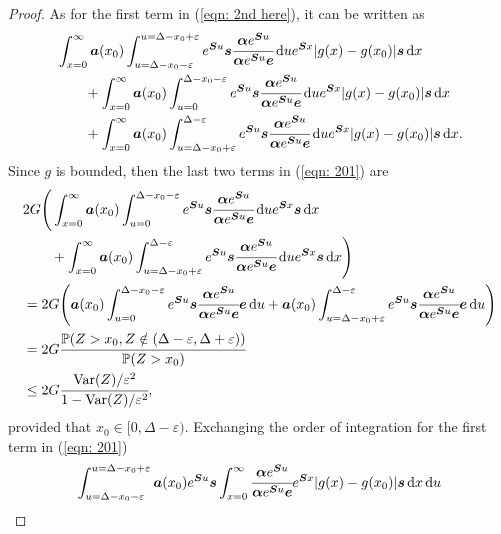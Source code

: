 \begin{proof}
	As for the first term in (\ref{eqn: 2nd here}), it can be written as 
	\begin{align}
		&\int_{x=0}^\infty \boldsymbol a(x_0)\int_{u=\Delta-x_0-\varepsilon}^{u=\Delta-x_0+\varepsilon} e^{\boldsymbol Su}\boldsymbol s \cfrac{\boldsymbol \alpha e^{\boldsymbol Su}}{\boldsymbol \alpha e^{\boldsymbol Su}\boldsymbol e} \, \mathrm{d} u e^{\boldsymbol Sx}|g(x) - g(x_0)|\boldsymbol s\, \mathrm{d} x \nonumber
		\\&\qquad{}+\int_{x=0}^\infty \boldsymbol a(x_0)\int_{u=0}^{\Delta-x_0-\varepsilon} e^{\boldsymbol Su}\boldsymbol s \cfrac{\boldsymbol \alpha e^{\boldsymbol Su}}{\boldsymbol \alpha e^{\boldsymbol Su}\boldsymbol e} \, \mathrm{d} u e^{\boldsymbol Sx}|g(x) - g(x_0)|\boldsymbol s\, \mathrm{d} x \nonumber
		\\&\qquad{}+\int_{x=0}^\infty \boldsymbol a(x_0)\int_{u=\Delta-x_0+\varepsilon}^{\Delta-\varepsilon} e^{\boldsymbol Su}\boldsymbol s \cfrac{\boldsymbol \alpha e^{\boldsymbol Su}}{\boldsymbol \alpha e^{\boldsymbol Su}\boldsymbol e} \, \mathrm{d} u e^{\boldsymbol Sx}|g(x) - g(x_0)|\boldsymbol s\, \mathrm{d} x. \label{eqn: 201}
	\end{align}
	Since \(g\) is bounded, then the last two terms in (\ref{eqn: 201}) are 
	\begin{align}
		&2G\Bigg(\int_{x=0}^\infty \boldsymbol a(x_0)\int_{u=0}^{\Delta-x_0-\varepsilon} e^{\boldsymbol Su}\boldsymbol s \cfrac{\boldsymbol \alpha e^{\boldsymbol Su}}{\boldsymbol \alpha e^{\boldsymbol Su}\boldsymbol e} \, \mathrm{d} u e^{\boldsymbol Sx}\boldsymbol s\, \mathrm{d} x \nonumber
		\\&\qquad{}+\int_{x=0}^\infty \boldsymbol a(x_0)\int_{u=\Delta-x_0+\varepsilon}^{\Delta-\varepsilon} e^{\boldsymbol Su}\boldsymbol s \cfrac{\boldsymbol \alpha e^{\boldsymbol Su}}{\boldsymbol \alpha e^{\boldsymbol Su}\boldsymbol e} \, \mathrm{d} u e^{\boldsymbol Sx}\boldsymbol s\, \mathrm{d} x\Bigg) \nonumber 
		\\&=2G\Bigg(\boldsymbol a(x_0)\int_{u=0}^{\Delta-x_0-\varepsilon} e^{\boldsymbol Su}\boldsymbol s \cfrac{\boldsymbol \alpha e^{\boldsymbol Su}}{\boldsymbol \alpha e^{\boldsymbol Su}\boldsymbol e}  \boldsymbol e  \, \mathrm{d} u\nonumber
		+ \boldsymbol a(x_0)\int_{u=\Delta-x_0+\varepsilon}^{\Delta-\varepsilon} e^{\boldsymbol Su}\boldsymbol s \cfrac{\boldsymbol \alpha e^{\boldsymbol Su}}{\boldsymbol \alpha e^{\boldsymbol Su}\boldsymbol e} \boldsymbol e\, \mathrm{d} u \Bigg) \nonumber
		\\&=2G \cfrac{\mathbb P(Z>x_0, Z\notin(\Delta-\varepsilon, \Delta+\varepsilon))}{\mathbb P(Z>x_0)}  \nonumber 
		\\&\leq 2G\cfrac{\mathrm{Var}(Z)/\varepsilon^2}{1-\mathrm{Var}(Z)/\varepsilon^2},
	\end{align}
	provided that \(x_0\in[0,\Delta-\varepsilon)\). 
	Exchanging the order of integration for the first term in (\ref{eqn: 201})
	\begin{align}
		\int_{u=\Delta-x_0-\varepsilon}^{u=\Delta-x_0+\varepsilon} \bs a(x_0) e^{\bs Su}\bs s\int_{x=0}^\infty \cfrac{\bs \alpha e^{\bs Su}}{\bs \alpha e^{\bs Su}\bs e} e^{\bs Sx}|g(x)-g(x_0)|\bs s\wrt x \wrt u \label{eqn: fdk13897}

\end{align}
\end{proof}
